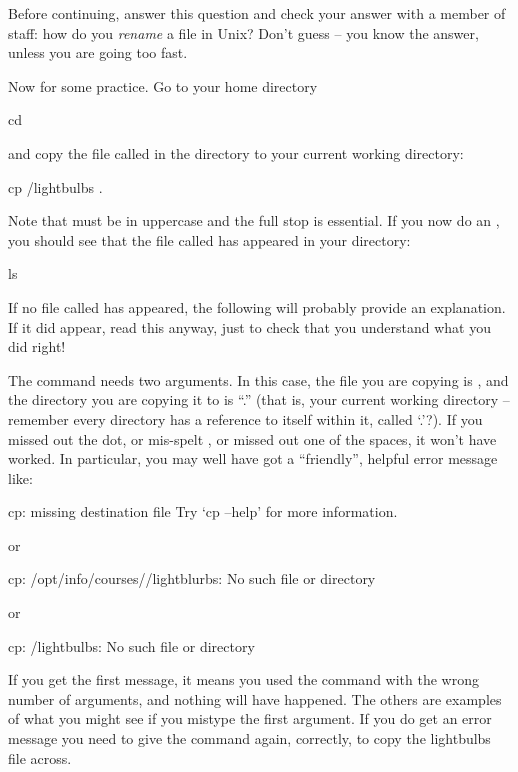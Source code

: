 Before continuing, answer this question and check your answer with a
member of staff: how do you \emph{rename} a file in Unix? Don't guess -- you
know the answer, unless you are going too fast.

Now for some practice. Go to your home directory
%
\begin{ttoutenv}
  cd \return
\end{ttoutenv}
%
and copy the file called  in the \fname{\Dcrsname}
directory to your current working directory:

\begin{ttoutenv}
  cp \Dcrsname/lightbulbs .  \return
\end{ttoutenv}
%
Note that \ilinput{\Dcrsname} must be in uppercase and the full stop is
essential.  If you now do an , you should see that the
file called  has appeared in your directory:

\begin{ttoutenv}
  ls \return
\end{ttoutenv}

If no file called  has appeared, the following will
probably provide an explanation. If it did appear, read this anyway, just to
check that you understand what you did right!

The  command needs two arguments. In this case, the file
you are copying is , and the directory
you are copying it to is ``.'' (that is, your current working
directory -- remember every directory has a reference to itself within
it, called `.'?). If you missed out the dot, or mis-spelt
, or missed out one of the spaces, it
won't have worked. In particular, you may well have got a
``friendly'', helpful error message like:
%
\begin{ttoutenv}
  cp: missing destination file
  Try `cp --help' for more information.
\end{ttoutenv}
%
or
\begin{ttoutenv}
  cp: /opt/info/courses/\crsname/lightblurbs: No such file or directory
\end{ttoutenv}
or
\begin{ttoutenv}
  cp: \crsname/lightbulbs: No such file or directory
\end{ttoutenv}
%
If you get the first message, it means you used the command with the
wrong number of arguments, and nothing will have happened.
The others are examples of what you might see if you mistype the first
argument. If you do get an error message you need to give the command again,
correctly, to copy the lightbulbs file across.

